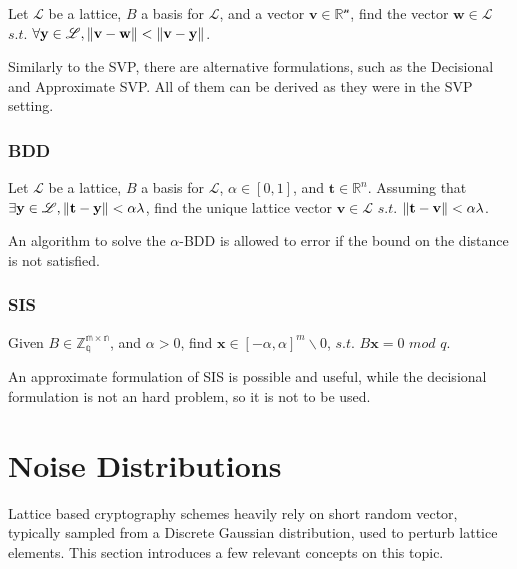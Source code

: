\begin{definition}
Let $\mathscr{L}$ be a lattice, $B$ a basis for $\mathscr{L}$, and a vector $\mathbf{v}\in\mathscr{\mathbb{R}^n}$, find the vector $\mathbf{w}\in\mathscr{L}$ $s.t.$ $\forall\mathbf{y}\in\mathscr{L},\left\lVert \mathbf{v}-\mathbf{w} \right\rVert < \left\lVert \mathbf{v}-\mathbf{y} \right\rVert$.
\end{definition}

Similarly to the SVP, there are alternative formulations, such as the Decisional and Approximate SVP. All of them can be derived as they were in the SVP setting.

\subsubsection{BDD}

\begin{definition}
Let $\mathscr{L}$ be a lattice, $B$ a basis for $\mathscr{L}$, $\alpha\in[0,1]$, and $\mathbf{t}\in\mathbb{R}^n$. Assuming that $\exists \mathbf{y}\in\mathscr{L},\left\lVert \mathbf{t}-\mathbf{y} \right\rVert < \alpha\lambda$, find the unique lattice vector $\mathbf{v}\in\mathscr{L}$ $s.t.$ $\left\lVert \mathbf{t}-\mathbf{v} \right\rVert<\alpha\lambda$.
\end{definition}

\begin{remark}
An algorithm to solve the $\alpha$-BDD is allowed to error if the bound on the distance is not satisfied.
\end{remark}

\subsubsection{SIS}

\begin{definition}
Given $B\in\mathbb{Z_q^{m\times n}}$, and $\alpha > 0$, find $\mathbf{x}\in[-\alpha,\alpha]^m\backslash{0}$, $s.t.$ $B\mathbf{x}=0$ $mod$ $q$.
\end{definition}

\begin{remark}
An approximate formulation of SIS is possible and useful, while the decisional formulation is not an hard problem, so it is not to be used.
\end{remark}

\section{Noise Distributions}
Lattice based cryptography schemes heavily rely on short random vector, typically sampled from a Discrete Gaussian distribution, used to perturb lattice elements. This section introduces a few relevant concepts on this topic.\\

